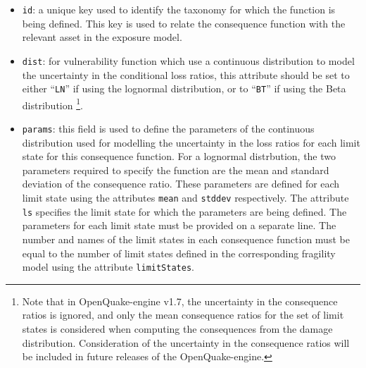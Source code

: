 \begin{itemize}

    \item \Verb+id+: a unique key used to identify the \gls{taxonomy} for 
    which the function is being defined. This key is used to relate the 
    \gls{consequence function} with the relevant \gls{asset} in the 
    \gls{exposure model}.

    \item \Verb+dist+: for vulnerability function which use a continuous 
    distribution to model the uncertainty in the conditional loss ratios, 
    this attribute should be set to either ``\Verb+LN+'' if using the lognormal
    distribution, or to ``\Verb+BT+'' if using the Beta distribution
    \footnote{Note that in OpenQuake-engine v1.7, the uncertainty in the 
    consequence ratios is ignored, and only the mean consequence ratios for the
    set of limit states is considered when computing the consequences from the
    damage distribution. Consideration of the uncertainty in the consequence
    ratios will be included in future releases of the OpenQuake-engine.}.

    \item \Verb+params+: this field is used to define the parameters of 
    the continuous distribution used for modelling the uncertainty in the
    loss ratios for each limit state for this 
    \gls{consequence function}. For a lognormal distrbution, 
    the two parameters required to specify the function are the mean and 
    standard deviation of the consequence ratio. These parameters are defined for 
    each limit state using the attributes \Verb+mean+ and \Verb+stddev+ 
    respectively. The attribute \Verb+ls+ specifies the limit state for which 
    the parameters are being defined. The parameters for each limit state
    must be provided on a separate line. The number and names of the limit 
    states in each \gls{consequence function} must be equal to the number of limit 
    states defined in the corresponding \gls{fragility model}
    using the attribute \Verb+limitStates+.

\end{itemize}